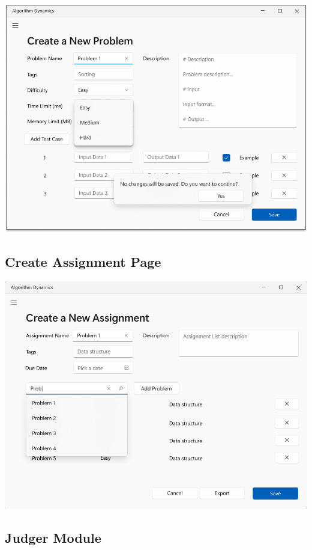 \documentclass[a4paper]{report}
\begin{document}
\includegraphics[width=\textwidth, height=\textheight, keepaspectratio]{CreateNewProblemPage-Expand-Design}

\subsection{Create Assignment Page}

\includegraphics[width=\textwidth, height=\textheight, keepaspectratio]{CreateNewAssignmentPage-Design}

\subsection{Judger Module}
\end{document}
